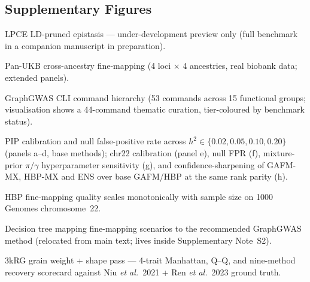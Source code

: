 \documentclass[pdflatex,sn-nature]{sn-jnl}
\begin{document}
\subsection*{Supplementary Figures}
\begin{description}
\setlength{\itemsep}{2pt}
\item[Figure S1] LPCE LD-pruned epistasis --- under-development preview only (full benchmark in a companion manuscript in preparation).
\item[Figure S2] Pan-UKB cross-ancestry fine-mapping (4 loci $\times$ 4 ancestries, real biobank data; extended panels).
\item[Figure S3] GraphGWAS CLI command hierarchy (53 commands across 15 functional groups; visualisation shows a 44-command thematic curation, tier-coloured by benchmark status).
\item[Figure S4] PIP calibration and null false-positive rate across $h^2 \in \{0.02, 0.05, 0.10, 0.20\}$ (panels a--d, base methods); chr22 calibration (panel e), null FPR (f), mixture-prior $\pi/\gamma$ hyperparameter sensitivity (g), and confidence-sharpening of GAFM-MX, HBP-MX and ENS over base GAFM/HBP at the same rank parity (h).
\item[Figure S5] HBP fine-mapping quality scales monotonically with sample size on 1000 Genomes chromosome~22.
\item[Figure S6] Decision tree mapping fine-mapping scenarios to the recommended GraphGWAS method (relocated from main text; lives inside Supplementary Note~S2).
\item[Figure S7] 3kRG grain weight + shape pass --- 4-trait Manhattan, Q--Q, and nine-method recovery scorecard against Niu \emph{et al.}\ 2021 + Ren \emph{et al.}\ 2023 ground truth.
\end{description}
\end{document}
